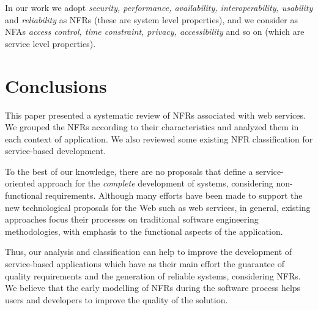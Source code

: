 \documentclass{sig-alternate}
\begin{document}
In our work we adopt \textit{security, performance, availability,
interoperability, usability} and \textit{reliability} as NFRs (these are
system level properties), and we consider as NFAs \textit{access control, time
constraint, privacy, accessibility} and so on (which are service level
properties).


\section{Conclusions}
\label{sec:conclusion}
 
 
This paper presented a systematic review of NFRs associated with web services.
We grouped the NFRs according to their characteristics and analyzed them in each
context of application. We also reviewed some existing NFR classification for service-based
development.

To the best of our knowledge, there are no proposals that define a
service-oriented approach for the \textit{complete} development of systems,
considering non-functional requirements. Although many efforts have been made to support the new
technological proposals for the Web such as web services, in general, existing
approaches focus their processes on traditional software engineering
methodologies, with emphasis to the functional aspects of the application.

Thus, our analysis and classification can help to improve the development of
service-based applications which have as their main effort the
guarantee of quality requirements and the generation of reliable systems,
considering NFRs. We believe that the early modelling of NFRs during the
software process helps users and developers to improve the quality of the
solution.
   

 
\end{document}
